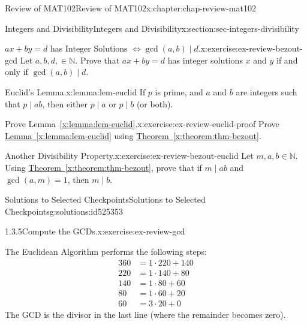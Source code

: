 \documentclass[oneside,10pt,]{book}
\newcommand{\xreffont}{\relax}
\numberwithin{equation}{section}
\newcommand{\amp}{&}
\begin{document}
\begin{chapterptx}{Review of MAT102}{}{Review of MAT102}{}{}{x:chapter:chap-review-mat102}
\begin{sectionptx}{Integers and Divisibility}{}{Integers and Divisibility}{}{}{x:section:sec-integers-divisibility}
\begin{inlineexercise}{\(ax + by = d\) has Integer Solutions \(\Leftrightarrow \gcd(a,b) \mid d\).}{x:exercise:ex-review-bezout-gcd}%
Let \(a, b, d, \in \mathbb{N}\). Prove that \(ax + by = d\) has integer solutions \(x\) and \(y\) if and only if \(\gcd(a,b) \mid d\).%
\end{inlineexercise}%
\begin{lemma}{Euclid's Lemma.}{}{x:lemma:lem-euclid}%
If \(p\) is prime, and \(a\) and \(b\) are integers such that \(p \mid ab\), then either \(p \mid a\) or \(p \mid b\) (or both).%
\end{lemma}
\begin{inlineexercise}{Prove Lemma~{\xreffont\ref*{x:lemma:lem-euclid}}.}{x:exercise:ex-review-euclid-proof}%
Prove \hyperref[x:lemma:lem-euclid]{Lemma~{\xreffont\ref{x:lemma:lem-euclid}}} using \hyperref[x:theorem:thm-bezout]{Theorem~{\xreffont\ref{x:theorem:thm-bezout}}}.%
\end{inlineexercise}%
\begin{inlineexercise}{Another Divisibility Property.}{x:exercise:ex-review-bezout-euclid}%
Let \(m,a,b \in \mathbb{N}\). Using \hyperref[x:theorem:thm-bezout]{Theorem~{\xreffont\ref{x:theorem:thm-bezout}}}, prove that if \(m \mid ab\) and \(\gcd(a,m) = 1\), then \(m \mid b\).%
\end{inlineexercise}%
%
%
\typeout{************************************************}
\typeout{************************************************}
%
\begin{solutions-subsection-numberless}{Solutions to Selected Checkpoints}{}{Solutions to Selected Checkpoints}{}{}{g:solutions:id525353}
\begin{inlinesolution}{1.3.5}{Compute the GCDs.}{x:exercise:ex-review-gcd}%
\par\smallskip%
\noindent\hypertarget{g:solution:id522476-main}{}The Euclidean Algorithm performs the following steps:%
\begin{align*}
360 \amp = 1 \cdot 220 + 140 \\
220 \amp = 1 \cdot 140 + 80 \\
140 \amp = 1 \cdot 80 + 60 \\
80 \amp = 1 \cdot 60 + 20 \\
60 \amp = 3 \cdot 20 + 0 
\end{align*}
The GCD is the divisor in the last line (where the remainder becomes zero).%
\end{inlinesolution}%
\end{solutions-subsection-numberless}
\end{sectionptx}
\end{chapterptx}
\end{document}
